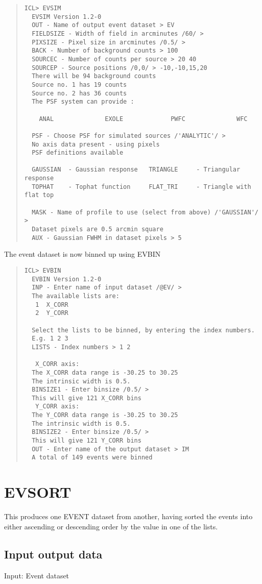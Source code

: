 \documentclass{book}
\renewcommand{\_}{{\tt\char'137}}     %
\begin{document}
\begin{quote}\begin{verbatim}
ICL> EVSIM
  EVSIM Version 1.2-0
  OUT - Name of output event dataset > EV
  FIELDSIZE - Width of field in arcminutes /60/ >
  PIXSIZE - Pixel size in arcminutes /0.5/ >
  BACK - Number of background counts > 100
  SOURCEC - Number of counts per source > 20 40
  SOURCEP - Source positions /0,0/ > -10,-10,15,20
  There will be 94 background counts
  Source no. 1 has 19 counts
  Source no. 2 has 36 counts
  The PSF system can provide :

    ANAL              EXOLE             PWFC              WFC

  PSF - Choose PSF for simulated sources /'ANALYTIC'/ >
  No axis data present - using pixels
  PSF definitions available

  GAUSSIAN  - Gaussian response   TRIANGLE     - Triangular response
  TOPHAT    - Tophat function     FLAT_TRI     - Triangle with flat top

  MASK - Name of profile to use (select from above) /'GAUSSIAN'/ >
  Dataset pixels are 0.5 arcmin square
  AUX - Gaussian FWHM in dataset pixels > 5
\end{verbatim}\end{quote}
The event dataset is now binned up using EVBIN
\begin{quote}\begin{verbatim}
ICL> EVBIN
  EVBIN Version 1.2-0
  INP - Enter name of input dataset /@EV/ >
  The available lists are:
   1  X_CORR
   2  Y_CORR

  Select the lists to be binned, by entering the index numbers.
  E.g. 1 2 3
  LISTS - Index numbers > 1 2

   X_CORR axis:
  The X_CORR data range is -30.25 to 30.25
  The intrinsic width is 0.5.
  BINSIZE1 - Enter binsize /0.5/ >
  This will give 121 X_CORR bins
   Y_CORR axis:
  The Y_CORR data range is -30.25 to 30.25
  The intrinsic width is 0.5.
  BINSIZE2 - Enter binsize /0.5/ >
  This will give 121 Y_CORR bins
  OUT - Enter name of the output dataset > IM
  A total of 149 events were binned
\end{verbatim}\end{quote}
\section{EVSORT}
This produces one EVENT dataset from another, having sorted the
events into either ascending or descending order by the value in
one of the lists.
\subsection{Input output data}
Input: Event dataset
\end{document}
